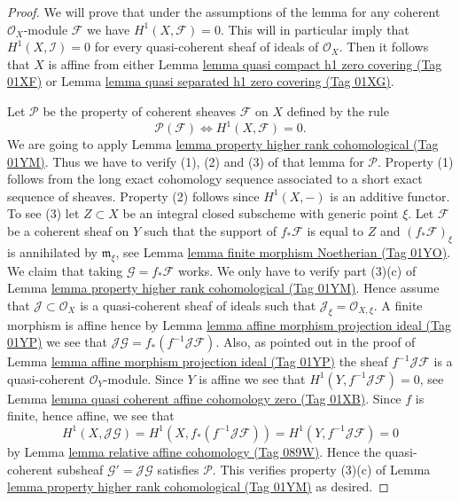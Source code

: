 \documentclass{amsart}
\theoremstyle{plain}
\theoremstyle{definition}
\theoremstyle{remark}
\numberwithin{equation}{subsection}
\begin{document}
\begin{proof}
We will prove that under the assumptions of the lemma for any coherent
$\mathcal{O}_X$-module $\mathcal{F}$ we have $H^1(X, \mathcal{F}) = 0$.
This will in particular imply that $H^1(X, \mathcal{I}) = 0$
for every quasi-coherent sheaf of ideals of $\mathcal{O}_X$. Then it
follows that $X$ is affine from either
Lemma \href{https://stacks.math.columbia.edu/tag/01XF}{lemma quasi compact h1 zero covering (Tag 01XF)} or
Lemma \href{https://stacks.math.columbia.edu/tag/01XG}{lemma quasi separated h1 zero covering (Tag 01XG)}.

\medskip\noindent
Let $\mathcal{P}$ be the property of coherent sheaves
$\mathcal{F}$ on $X$ defined by the rule
$$
\mathcal{P}(\mathcal{F}) \Leftrightarrow H^1(X, \mathcal{F}) = 0.
$$
We are going to apply Lemma \href{https://stacks.math.columbia.edu/tag/01YM}{lemma property higher rank cohomological (Tag 01YM)}.
Thus we have to verify (1), (2) and (3) of that lemma for $\mathcal{P}$.
Property (1) follows from the long exact cohomology sequence associated
to a short exact sequence of sheaves. Property (2) follows since
$H^1(X, -)$ is an additive functor. To see (3) let $Z \subset X$ be
an integral closed subscheme with generic point $\xi$.
Let $\mathcal{F}$ be a coherent sheaf on $Y$ such that
the support of $f_*\mathcal{F}$ is equal to $Z$
and $(f_*\mathcal{F})_\xi$ is annihilated by $\mathfrak m_\xi$,
see Lemma \href{https://stacks.math.columbia.edu/tag/01YO}{lemma finite morphism Noetherian (Tag 01YO)}. We claim that
taking $\mathcal{G} = f_*\mathcal{F}$ works. We only have to verify
part (3)(c) of Lemma \href{https://stacks.math.columbia.edu/tag/01YM}{lemma property higher rank cohomological (Tag 01YM)}.
Hence assume that $\mathcal{J} \subset \mathcal{O}_X$ is a
quasi-coherent sheaf of ideals such that
$\mathcal{J}_\xi = \mathcal{O}_{X, \xi}$.
A finite morphism is affine hence by
Lemma \href{https://stacks.math.columbia.edu/tag/01YP}{lemma affine morphism projection ideal (Tag 01YP)} we see that
$\mathcal{J}\mathcal{G} = f_*(f^{-1}\mathcal{J}\mathcal{F})$.
Also, as pointed out in the proof of
Lemma \href{https://stacks.math.columbia.edu/tag/01YP}{lemma affine morphism projection ideal (Tag 01YP)} the sheaf
$f^{-1}\mathcal{J}\mathcal{F}$ is a quasi-coherent $\mathcal{O}_Y$-module.
Since $Y$ is affine we see that $H^1(Y, f^{-1}\mathcal{J}\mathcal{F}) = 0$,
see Lemma \href{https://stacks.math.columbia.edu/tag/01XB}{lemma quasi coherent affine cohomology zero (Tag 01XB)}.
Since $f$ is finite, hence affine, we see that
$$
H^1(X, \mathcal{J}\mathcal{G}) =
H^1(X, f_*(f^{-1}\mathcal{J}\mathcal{F})) =
H^1(Y, f^{-1}\mathcal{J}\mathcal{F}) = 0
$$
by Lemma \href{https://stacks.math.columbia.edu/tag/089W}{lemma relative affine cohomology (Tag 089W)}.
Hence the quasi-coherent subsheaf $\mathcal{G}' = \mathcal{J}\mathcal{G}$
satisfies $\mathcal{P}$. This verifies property (3)(c) of
Lemma \href{https://stacks.math.columbia.edu/tag/01YM}{lemma property higher rank cohomological (Tag 01YM)} as desired.
\end{proof}
\end{document}
